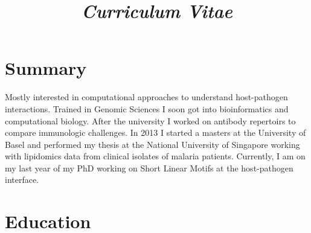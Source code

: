 \documentclass[11pt,a4paper,sans]{moderncv} %
\title{\emph{Curriculum Vitae}}
\begin{document}
\makecvtitle %
\vspace{-1.2cm}
\section{Summary}
Mostly interested in computational approaches to understand host-pathogen interactions. Trained in Genomic Sciences I soon got into bioinformatics and computational biology. After the university I worked on antibody repertoirs to compare immunologic challenges. In 2013 I started a masters at the University of Basel and performed my thesis at the National University of Singapore working with lipidomics data from clinical isolates of malaria patients. Currently, I am on my last year of my PhD working on Short Linear Motifs at the host-pathogen interface.

\section{Education}


\end{document}
